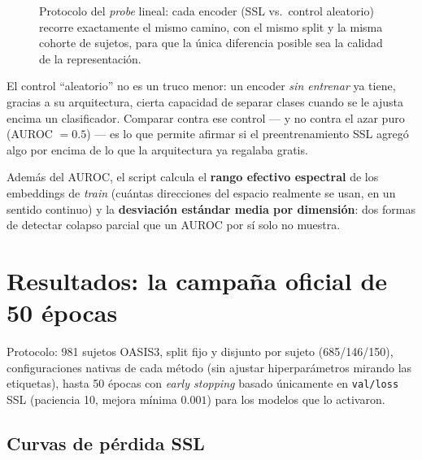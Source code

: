 \documentclass[11pt,a4paper]{article}
\begin{document}
\begin{figure}[htbp]
\caption{Protocolo del \emph{probe} lineal: cada encoder (SSL vs.\ control
aleatorio) recorre exactamente el mismo camino, con el mismo split y la
misma cohorte de sujetos, para que la única diferencia posible sea la
calidad de la representación.}
\label{fig:probe}
\end{figure}

\begin{ideabox}
El control ``aleatorio'' no es un truco menor: un encoder \emph{sin
entrenar} ya tiene, gracias a su arquitectura, cierta capacidad de separar
clases cuando se le ajusta encima un clasificador. Comparar contra ese
control --- y no contra el azar puro (AUROC $=0.5$) --- es lo que permite
afirmar si el preentrenamiento SSL agregó algo por encima de lo que la
arquitectura ya regalaba gratis.
\end{ideabox}

Además del AUROC, el script calcula el \textbf{rango efectivo espectral} de
los embeddings de \emph{train} (cuántas direcciones del espacio realmente se
usan, en un sentido continuo) y la \textbf{desviación estándar media por
dimensión}: dos formas de detectar colapso parcial que un AUROC por sí solo
no muestra.

\section{Resultados: la campaña oficial de 50 épocas}
\label{sec:results}

Protocolo: 981 sujetos OASIS3, split fijo y disjunto por sujeto
(685/146/150), configuraciones nativas de cada método (sin ajustar
hiperparámetros mirando las etiquetas), hasta 50 épocas con \emph{early
stopping} basado únicamente en \texttt{val/loss} SSL (paciencia 10, mejora
mínima $0.001$) para los modelos que lo activaron.

\subsection{Curvas de pérdida SSL}
\end{document}

